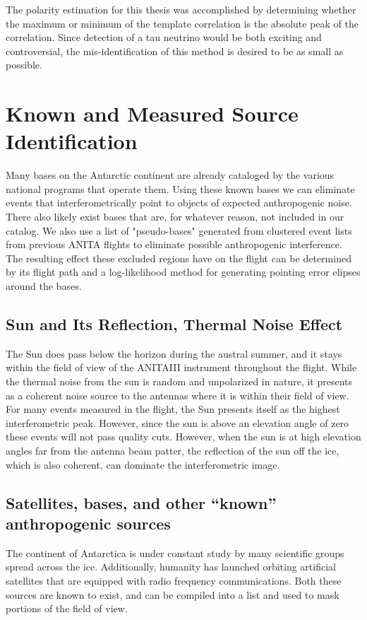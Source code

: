 	The polarity estimation for this thesis was accomplished by determining whether the maximum or minimum of the template correlation is the absolute peak of the correlation.  Since detection of a tau neutrino would be both exciting and controversial, the mis-identification of this method is desired to be as small as possible.

		
\section{Known and Measured Source Identification}%
	Many bases on the Antarctic continent are already cataloged by the various national programs that operate them.  Using these known bases we can eliminate events that interferometrically point to objects of expected anthropogenic noise.  There also likely exist bases that are, for whatever reason, not included in our catalog.  We also use a list of "pseudo-bases" generated from clustered event lists from previous ANITA flights to eliminate possible anthropogenic interference.  The resulting effect these excluded regions have on the flight can be determined by its flight path and a log-likelihood method for generating pointing error elipses around the bases.
	
	
	\subsection{Sun and Its Reflection, Thermal Noise Effect}
		The Sun does pass below the horizon during the austral summer, and it stays within the field of view of the ANITAIII instrument throughout the flight.  While the thermal noise from the sun is random and unpolarized in nature, it presents as a coherent noise source to the antennas where it is within their field of view.  For many events measured in the flight, the Sun presents itself as the highest interferometric peak.  However, since the sun is above an elevation angle of zero these events will not pass quality cuts. However, when the sun is at high elevation angles far from the antenna beam patter, the reflection of the sun off the ice, which is also coherent, can dominate the interferometric image.
	
	\subsection{Satellites, bases, and other ``known'' anthropogenic sources}
		The continent of Antarctica is under constant study by many scientific groups spread across the ice.  Additionally, humanity has launched orbiting artificial satellites that are equipped with radio frequency communications.  Both these sources are known to exist, and can be compiled into a list and used to mask portions of the field of view.  

